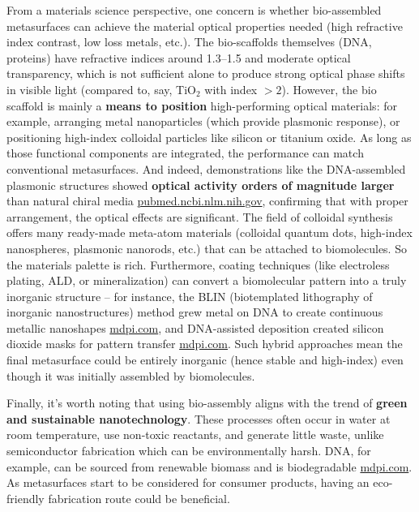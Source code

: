 \documentclass[11pt,a4paper]{article}
\begin{document}
From a materials science perspective, one concern is whether bio-assembled metasurfaces can achieve the material optical properties needed (high refractive index contrast, low loss metals, etc.). The bio-scaffolds themselves (DNA, proteins) have refractive indices around 1.3--1.5 and moderate optical transparency, which is not sufficient alone to produce strong optical phase shifts in visible light (compared to, say, TiO$_2$ with index $>2$). However, the bio scaffold is mainly a \textbf{means to position} high-performing optical materials: for example, arranging metal nanoparticles (which provide plasmonic response), or positioning high-index colloidal particles like silicon or titanium oxide. As long as those functional components are integrated, the performance can match conventional metasurfaces. And indeed, demonstrations like the DNA-assembled plasmonic structures showed \textbf{optical activity orders of magnitude larger} than natural chiral media \href{https://pubmed.ncbi.nlm.nih.gov/38859241/#:~:text=Chiral materials are essential to,production%2C to fabricate a chiral}{pubmed.ncbi.nlm.nih.gov}, confirming that with proper arrangement, the optical effects are significant. The field of colloidal synthesis offers many ready-made meta-atom materials (colloidal quantum dots, high-index nanospheres, plasmonic nanorods, etc.) that can be attached to biomolecules. So the materials palette is rich. Furthermore, coating techniques (like electroless plating, ALD, or mineralization) can convert a biomolecular pattern into a truly inorganic structure -- for instance, the BLIN (biotemplated lithography of inorganic nanostructures) method grew metal on DNA to create continuous metallic nanoshapes \href{https://www.mdpi.com/2079-6374/12/11/962#:~:text=match at L2031 DNA origami,a hard mask for surface}{mdpi.com}, and DNA-assisted deposition created silicon dioxide masks for pattern transfer \href{https://www.mdpi.com/2079-6374/12/11/962#:~:text=DNA origami can be organized,lithography to create discrete%2C well}{mdpi.com}. Such hybrid approaches mean the final metasurface could be entirely inorganic (hence stable and high-index) even though it was initially assembled by biomolecules.

Finally, it's worth noting that using bio-assembly aligns with the trend of \textbf{green and sustainable nanotechnology}. These processes often occur in water at room temperature, use non-toxic reactants, and generate little waste, unlike semiconductor fabrication which can be environmentally harsh. DNA, for example, can be sourced from renewable biomass and is biodegradable \href{https://www.mdpi.com/2079-6374/12/11/962#:~:text=feedstocks%2C nucleic acids (e,in mammalian}{mdpi.com}. As metasurfaces start to be considered for consumer products, having an eco-friendly fabrication route could be beneficial.
\end{document}
